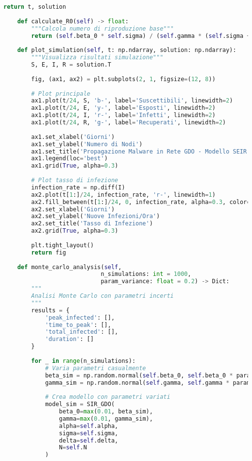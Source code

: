 \begin{lstlisting}[language=Python, caption=Simulazione modello SIR adattato per GDO]
        return t, solution
    
    def calculate_R0(self) -> float:
        """Calcola numero di riproduzione base"""
        return (self.beta_0 * self.sigma) / (self.gamma * (self.sigma + self.gamma))
    
    def plot_simulation(self, t: np.ndarray, solution: np.ndarray):
        """Visualizza risultati simulazione"""
        S, E, I, R = solution.T
        
        fig, (ax1, ax2) = plt.subplots(2, 1, figsize=(12, 8))
        
        # Plot principale
        ax1.plot(t/24, S, 'b-', label='Suscettibili', linewidth=2)
        ax1.plot(t/24, E, 'y-', label='Esposti', linewidth=2)
        ax1.plot(t/24, I, 'r-', label='Infetti', linewidth=2)
        ax1.plot(t/24, R, 'g-', label='Recuperati', linewidth=2)
        
        ax1.set_xlabel('Giorni')
        ax1.set_ylabel('Numero di Nodi')
        ax1.set_title('Propagazione Malware in Rete GDO - Modello SEIR')
        ax1.legend(loc='best')
        ax1.grid(True, alpha=0.3)
        
        # Plot tasso di infezione
        infection_rate = np.diff(I)
        ax2.plot(t[1:]/24, infection_rate, 'r-', linewidth=1)
        ax2.fill_between(t[1:]/24, 0, infection_rate, alpha=0.3, color='red')
        ax2.set_xlabel('Giorni')
        ax2.set_ylabel('Nuove Infezioni/Ora')
        ax2.set_title('Tasso di Infezione')
        ax2.grid(True, alpha=0.3)
        
        plt.tight_layout()
        return fig
    
    def monte_carlo_analysis(self, 
                            n_simulations: int = 1000,
                            param_variance: float = 0.2) -> Dict:
        """
        Analisi Monte Carlo con parametri incerti
        """
        results = {
            'peak_infected': [],
            'time_to_peak': [],
            'total_infected': [],
            'duration': []
        }
        
        for _ in range(n_simulations):
            # Varia parametri casualmente
            beta_sim = np.random.normal(self.beta_0, self.beta_0 * param_variance)
            gamma_sim = np.random.normal(self.gamma, self.gamma * param_variance)
            
            # Crea modello con parametri variati
            model_sim = SIR_GDO(
                beta_0=max(0.01, beta_sim),
                gamma=max(0.01, gamma_sim),
                alpha=self.alpha,
                sigma=self.sigma,
                delta=self.delta,
                N=self.N
            )
            

\end{lstlisting}

